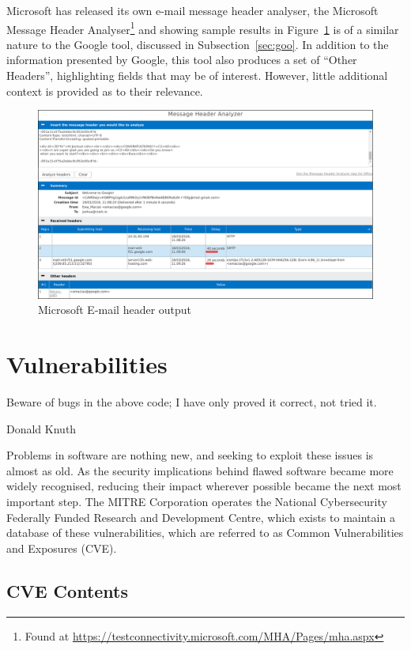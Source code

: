 Microsoft has released its own e-mail message header analyser, the Microsoft
Message Header Analyser\footnote{Found at
	\url{https://testconnectivity.microsoft.com/MHA/Pages/mha.aspx}} and
showing sample results in Figure~\ref{fig:mic} is of a similar nature to the
Google tool, discussed in Subsection~\ref{sec:goo}.  In addition to the
information presented by Google, this tool also produces a set of ``Other
Headers'', highlighting fields that may be of interest.  However, little
additional context is provided as to their relevance.

\begin{figure}

	\centering \includegraphics[width=0.9\linewidth]{microsoft-header}

\caption{Microsoft E-mail header output} \label{fig:mic}\end{figure}

\section{Vulnerabilities}

\epigraph{Beware of bugs in the above code; I have only proved it correct, not
	tried it.}{Donald Knuth}

Problems in software are nothing new, and seeking to exploit these issues is
almost as old.   As the security implications behind flawed software became
more widely recognised, reducing their impact wherever possible became the next
most important step.  The MITRE Corporation operates the National Cybersecurity
Federally Funded Research and Development Centre, which exists to maintain a
database of these vulnerabilities, which are referred to as Common
Vulnerabilities and Exposures (CVE).

\subsection{CVE Contents}

